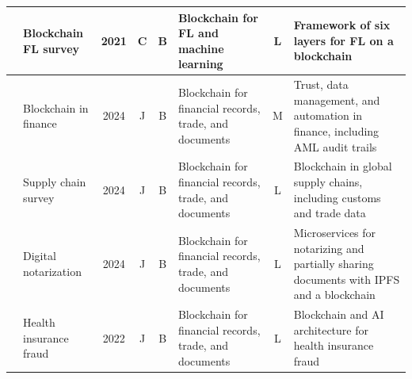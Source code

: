 \documentclass[journal]{IEEEtran}
\begin{document}
\begin{table}[!t]
\begin{tabularx}{\textwidth}{@{}L{0.7cm}L{2.45cm}cccL{3.0cm}cY@{}}
\cite{li2021befl} & Blockchain FL survey & 2021 & C & B & Blockchain for FL and machine learning & L & Framework of six layers for FL on a blockchain\\
\midrule
\cite{chen2024finance} & Blockchain in finance & 2024 & J & B & Blockchain for financial records, trade, and documents & M & Trust, data management, and automation in finance, including AML audit trails\\
\cite{dudczyk2024supply} & Supply chain survey & 2024 & J & B & Blockchain for financial records, trade, and documents & L & Blockchain in global supply chains, including customs and trade data\\
\cite{cosmin2024notary} & Digital notarization & 2024 & J & B & Blockchain for financial records, trade, and documents & L & Microservices for notarizing and partially sharing documents with IPFS and a blockchain\\
\cite{kapadiya2022health} & Health insurance fraud & 2022 & J & B & Blockchain for financial records, trade, and documents & L & Blockchain and AI architecture for health insurance fraud\\
\bottomrule
\end{tabularx}
\end{table}
\end{document}
